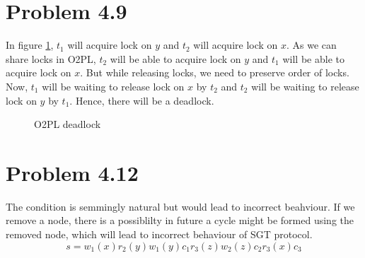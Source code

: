 \documentclass[12pt]{article}
\begin{document}
\section*{Problem 4.9}
In figure \ref{fig:deadlock_q2}, $t_1$ will acquire lock on $y$ and $t_2$ will acquire lock on $x$. As we can share locks in O2PL, $t_2$ will be able to acquire lock on $y$ and $t_1$ will be able to acquire lock on $x$. But while releasing locks, we need to preserve order of locks. Now, $t_1$ will be waiting to release lock on $x$ by $t_2$ and $t_2$ will be waiting to release lock on $y$ by $t_1$. Hence, there will be a deadlock.
\begin{figure}[h]
    \centering
    \caption{O2PL deadlock}
    \label{fig:deadlock_q2}
\end{figure}

\section*{Problem 4.12}
The condition is semmingly natural but would lead to incorrect beahviour. If we remove a node, there is a possiblilty in future a cycle might be formed using the removed node, which will lead to incorrect behaviour of SGT protocol.
\begin{equation*}
    s = w_1(x) r_2(y) w_1(y) c_1 r_3(z) w_2(z) c_2 r_3(x) c_3
\end{equation*}
\end{document}
